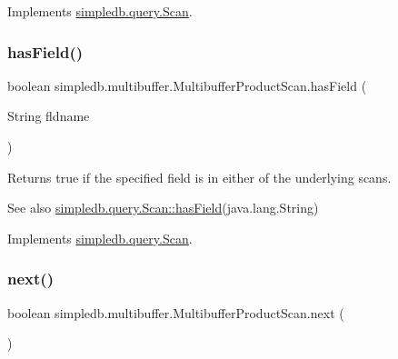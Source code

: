 Implements \hyperlink{interfacesimpledb_1_1query_1_1Scan_aca80bca2857c983a88834bf6c01ee5ca}{simpledb.\+query.\+Scan}.

\mbox{\label{classsimpledb_1_1multibuffer_1_1MultibufferProductScan_afc843ca9e632e75d171245fe59e2bd14}} 
\subsubsection{\texorpdfstring{has\+Field()}{hasField()}}
{\footnotesize\ttfamily boolean simpledb.\+multibuffer.\+Multibuffer\+Product\+Scan.\+has\+Field (\begin{DoxyParamCaption}\item[{String}]{fldname }\end{DoxyParamCaption})\hspace{0.3cm}{\ttfamily [inline]}}

Returns true if the specified field is in either of the underlying scans. \begin{DoxySeeAlso}{See also}
\hyperlink{interfacesimpledb_1_1query_1_1Scan_a8f4ccf13eed0bed983c928e9b998fe5c}{simpledb.\+query.\+Scan\+::has\+Field}(java.\+lang.\+String) 
\end{DoxySeeAlso}


Implements \hyperlink{interfacesimpledb_1_1query_1_1Scan_a8f4ccf13eed0bed983c928e9b998fe5c}{simpledb.\+query.\+Scan}.

\mbox{\label{classsimpledb_1_1multibuffer_1_1MultibufferProductScan_aec94240353c72bb7eedb60dbe7d3d5e6}} 
\subsubsection{\texorpdfstring{next()}{next()}}
{\footnotesize\ttfamily boolean simpledb.\+multibuffer.\+Multibuffer\+Product\+Scan.\+next (\begin{DoxyParamCaption}{ }\end{DoxyParamCaption})\hspace{0.3cm}{\ttfamily [inline]}}

